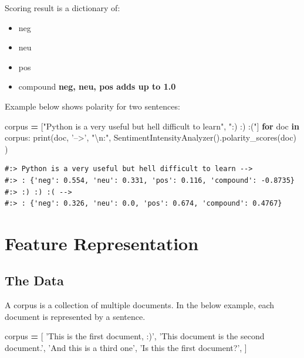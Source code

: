 \documentclass[
]{book}
\newenvironment{Shaded}{\begin{snugshade}}{\end{snugshade}}
\newcommand{\BuiltInTok}[1]{#1}
\newcommand{\CharTok}[1]{\textcolor[rgb]{0.5,0.5,0.5}{#1}}
\newcommand{\ControlFlowTok}[1]{\textcolor[rgb]{0.27,0.27,0.27}{\textbf{#1}}}
\newcommand{\KeywordTok}[1]{\textcolor[rgb]{0.27,0.27,0.27}{\textbf{#1}}}
\newcommand{\NormalTok}[1]{#1}
\newcommand{\OperatorTok}[1]{\textcolor[rgb]{0.43,0.43,0.43}{\textbf{#1}}}
\newcommand{\StringTok}[1]{\textcolor[rgb]{0.5,0.5,0.5}{#1}}
\providecommand{\tightlist}{%
  \setlength{\itemsep}{0pt}\setlength{\parskip}{0pt}}
\begin{document}
Scoring result is a dictionary of:

\begin{itemize}
\tightlist
\item
  neg
\item
  neu
\item
  pos
\item
  compound \textbf{neg, neu, pos adds up to 1.0}
\end{itemize}

Example below shows polarity for two sentences:

\begin{Shaded}
\begin{Highlighting}[]
\NormalTok{corpus }\OperatorTok{=}\NormalTok{ [}\StringTok{"Python is a very useful but hell difficult to learn"}\NormalTok{,}
        \StringTok{":) :) :("}\NormalTok{]}
\ControlFlowTok{for}\NormalTok{ doc }\KeywordTok{in}\NormalTok{ corpus:}
  \BuiltInTok{print}\NormalTok{(doc, }\StringTok{'-->'}\NormalTok{, }\StringTok{"}\CharTok{\textbackslash{}n}\StringTok{:"}\NormalTok{, SentimentIntensityAnalyzer().polarity_scores(doc) )}
\end{Highlighting}
\end{Shaded}

\begin{verbatim}
#:> Python is a very useful but hell difficult to learn --> 
#:> : {'neg': 0.554, 'neu': 0.331, 'pos': 0.116, 'compound': -0.8735}
#:> :) :) :( --> 
#:> : {'neg': 0.326, 'neu': 0.0, 'pos': 0.674, 'compound': 0.4767}
\end{verbatim}

\hypertarget{feature-representation}{%
\section{Feature Representation}\label{feature-representation}}

\hypertarget{the-data-3}{%
\subsection{The Data}\label{the-data-3}}

A corpus is a collection of multiple documents. In the below example, each document is represented by a sentence.

\begin{Shaded}
\begin{Highlighting}[]
\NormalTok{corpus }\OperatorTok{=}\NormalTok{ [}
   \StringTok{'This is the first document, :)'}\NormalTok{,}
   \StringTok{'This document is the second document.'}\NormalTok{,}
   \StringTok{'And this is a third one'}\NormalTok{,}
   \StringTok{'Is this the first document?'}\NormalTok{,}
\NormalTok{]}
\end{Highlighting}
\end{Shaded}
\end{document}
